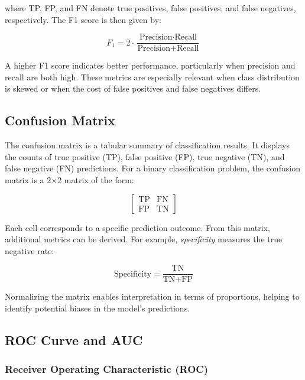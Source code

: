 \documentclass{pracalicmgr}
\begin{document}
where TP, FP, and FN denote true positives, false positives, and false negatives, respectively. The F1 score is then given by:

\[
F_1 = 2 \cdot \frac{\text{Precision} \cdot \text{Recall}}{\text{Precision} + \text{Recall}}
\]

A higher F1 score indicates better performance, particularly when precision and recall are both high. These metrics are especially relevant when class distribution is skewed or when the cost of false positives and false negatives differs.

\subsection{Confusion Matrix}

The confusion matrix is a tabular summary of classification results. It displays the counts of true positive (TP), false positive (FP), true negative (TN), and false negative (FN) predictions. For a binary classification problem, the confusion matrix is a 2×2 matrix of the form:

\[
\begin{bmatrix}
\text{TP} & \text{FN} \\
\text{FP} & \text{TN}
\end{bmatrix}
\]

Each cell corresponds to a specific prediction outcome. From this matrix, additional metrics can be derived. For example, \textit{specificity} measures the true negative rate:

\[
\text{Specificity} = \frac{\text{TN}}{\text{TN} + \text{FP}}
\]

Normalizing the matrix enables interpretation in terms of proportions, helping to identify potential biases in the model's predictions.

\subsection{ROC Curve and AUC}

\subsubsection{Receiver Operating Characteristic (ROC)}
\end{document}
